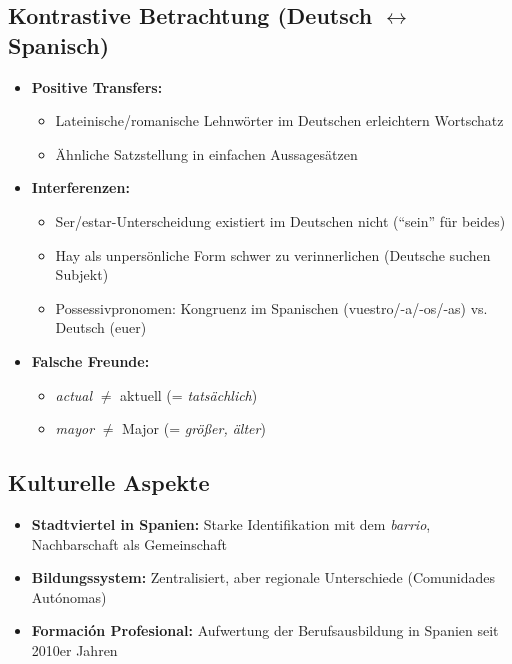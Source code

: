 \documentclass[11pt,a4paper]{article}
\begin{document}
\subsection{Kontrastive Betrachtung (Deutsch $\leftrightarrow$ Spanisch)}

\begin{itemize}
    \item \textbf{Positive Transfers:}
    \begin{itemize}
        \item Lateinische/romanische Lehnwörter im Deutschen erleichtern Wortschatz
        \item Ähnliche Satzstellung in einfachen Aussagesätzen
    \end{itemize}
    \item \textbf{Interferenzen:}
    \begin{itemize}
        \item Ser/estar-Unterscheidung existiert im Deutschen nicht (``sein'' für beides)
        \item Hay als unpersönliche Form schwer zu verinnerlichen (Deutsche suchen Subjekt)
        \item Possessivpronomen: Kongruenz im Spanischen (vuestro/-a/-os/-as) vs. Deutsch (euer)
    \end{itemize}
    \item \textbf{Falsche Freunde:}
    \begin{itemize}
        \item \textit{actual} $\neq$ aktuell (= \textit{tatsächlich})
        \item \textit{mayor} $\neq$ Major (= \textit{größer, älter})
    \end{itemize}
\end{itemize}

\subsection{Kulturelle Aspekte}

\begin{itemize}
    \item \textbf{Stadtviertel in Spanien:} Starke Identifikation mit dem \textit{barrio}, Nachbarschaft als Gemeinschaft
    \item \textbf{Bildungssystem:} Zentralisiert, aber regionale Unterschiede (Comunidades Autónomas)
    \item \textbf{Formación Profesional:} Aufwertung der Berufsausbildung in Spanien seit 2010er Jahren
\end{itemize}
\end{document}
